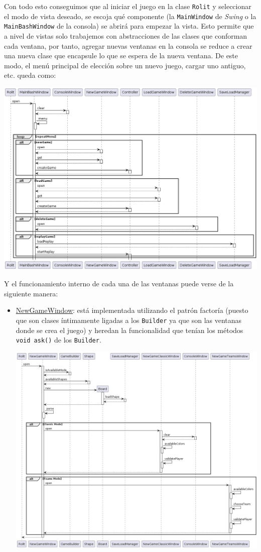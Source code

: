 \documentclass[../DocumentoOficial.tex]{subfiles}
\begin{document}
\begin{sprint}[5]
Con todo esto conseguimos que al iniciar el juego en la clase \texttt{Rolit} y seleccionar el modo de vista deseado, se escoja qué componente (la \texttt{MainWindow} de \textit{Swing} o la \texttt{MainBashWindow} de la consola) se abrirá para empezar la vista. Esto permite que a nivel de vistas solo trabajemos con abstracciones de las clases que conforman cada ventana, por tanto, agregar nuevas ventanas en la consola se reduce a crear una nueva clase que encapsule lo que se espera de la nueva ventana. De este modo, el menú principal de elección sobre un nuevo juego, cargar uno antiguo, etc. queda como:
\begin{center}
\includegraphics[scale=0.40]{MenuPpal_sprint5_seq}
\end{center}
Y el funcionamiento interno de cada una de las ventanas puede verse de la siguiente manera:
\begin{itemize}
\item \underline{NewGameWindow}: está implementada utilizando el patrón factoría (puesto que son clases íntimamente ligadas a los \texttt{Builder} ya que son las ventanas donde se crea el juego) y heredan la funcionalidad que tenían los métodos \texttt{void ask()} de los \texttt{Builder}.
\begin{center}
\includegraphics[scale=0.40, angle=90]{NewGameWindow_sprint5_seq}

\end{center}
\end{itemize}
\end{sprint}
\end{document}
